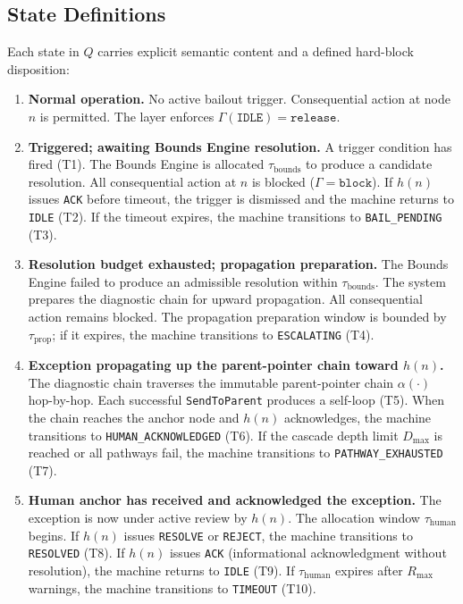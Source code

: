 \subsection{State Definitions}
\label{sec:bp-state-definitions}

Each state in $Q$ carries explicit semantic content and a defined hard-block disposition:

\begin{enumerate}\itemsep=0pt
\item[$\mathbf{\texttt{IDLE}}$] \textbf{Normal operation.} No active bailout trigger. Consequential action at node $n$ is permitted. The \fact{} layer enforces $\Gamma(\texttt{IDLE}) = \texttt{release}$.

\item[$\mathbf{\texttt{BOUNDED}}$] \textbf{Triggered; awaiting Bounds Engine resolution.} A trigger condition has fired (T1). The Bounds Engine is allocated $\tau_{\text{bounds}}$ to produce a candidate resolution. All consequential action at $n$ is blocked ($\Gamma = \texttt{block}$). If $h(n)$ issues \texttt{ACK} before timeout, the trigger is dismissed and the machine returns to \texttt{IDLE} (T2). If the timeout expires, the machine transitions to \texttt{BAIL\_PENDING} (T3).

\item[$\mathbf{\texttt{BAIL\_PENDING}}$] \textbf{Resolution budget exhausted; propagation preparation.} The Bounds Engine failed to produce an admissible resolution within $\tau_{\text{bounds}}$. The system prepares the diagnostic chain for upward propagation. All consequential action remains blocked. The propagation preparation window is bounded by $\tau_{\text{prop}}$; if it expires, the machine transitions to \texttt{ESCALATING} (T4).

\item[$\mathbf{\texttt{ESCALATING}}$] \textbf{Exception propagating up the parent-pointer chain toward $h(n)$.} The diagnostic chain traverses the immutable parent-pointer chain $\alpha(\cdot)$ hop-by-hop. Each successful \texttt{SendToParent} produces a self-loop (T5). When the chain reaches the anchor node and $h(n)$ acknowledges, the machine transitions to \texttt{HUMAN\_ACKNOWLEDGED} (T6). If the cascade depth limit $D_{\max}$ is reached or all pathways fail, the machine transitions to \texttt{PATHWAY\_EXHAUSTED} (T7).

\item[$\mathbf{\texttt{HUMAN\_ACKNOWLEDGED}}$] \textbf{Human anchor has received and acknowledged the exception.} The exception is now under active review by $h(n)$. The allocation window $\tau_{\text{human}}$ begins. If $h(n)$ issues \texttt{RESOLVE} or \texttt{REJECT}, the machine transitions to \texttt{RESOLVED} (T8). If $h(n)$ issues \texttt{ACK} (informational acknowledgment without resolution), the machine returns to \texttt{IDLE} (T9). If $\tau_{\text{human}}$ expires after $R_{\max}$ warnings, the machine transitions to \texttt{TIMEOUT} (T10).


\end{enumerate}
